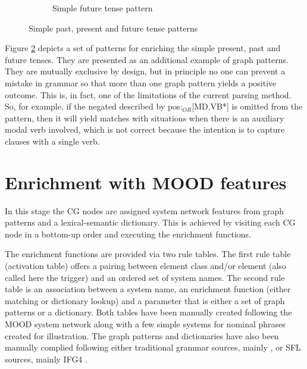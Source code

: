 \begin{figure}[!ht]
\begin{subfigure}[t]{0.47\textwidth}
            \caption{Simple future tense pattern}
            \label{fig:future-tense-pattern1}
        \end{subfigure}
        \caption{Simple past, present and future tense patterns}
        \label{fig:simple-tense-pattern1}
    \end{figure}

    Figure \ref{fig:simple-tense-pattern1} depicts a set of patterns for enriching the simple present, past and future tenses. They are presented as an additional example of graph patterns. They are mutually exclusive by design, but in principle no one can prevent a mistake in grammar so that more than one graph pattern yields a positive outcome. This is, in fact, one of the limitations of the current parsing method. So, for example, if the negated described by pos:$_{OR}$[MD,VB*] is omitted from the pattern, then it will yield matches with situations when there is an auxiliary modal verb involved, which is not correct because the intention is to capture clauses with a single verb.  

\section{Enrichment with MOOD features}
\label{sec:enrichment-stage}

    In this stage the CG nodes are assigned system network features from graph patterns and a lexical-semantic dictionary. This is achieved by visiting each CG node in a bottom-up order and executing the enrichment functions. 

    The enrichment functions are provided via two rule tables. The first rule table (activation table) offers a pairing between element class and/or element (also called here the trigger) and an ordered set of system names. The second rule table is an association between a system name, an enrichment function (either matching or dictionary lookup) and a parameter that is either a set of graph patterns or a dictionary. Both tables have been manually created following the MOOD system network along with  a few simple systems for nominal phrases created for illustration. The graph patterns and dictionaries have also been manually complied following either traditional grammar sources, mainly \citet{Quirk1985}, or SFL sources, mainly IFG4 \citep{Halliday2013}. 


